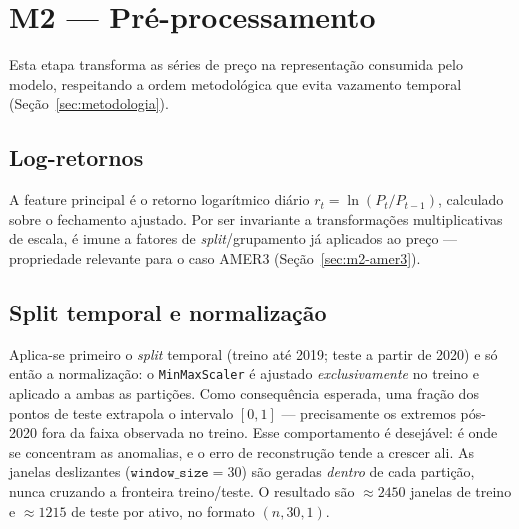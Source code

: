 \section{M2 --- Pré-processamento}
\label{sec:m2}

Esta etapa transforma as séries de preço na representação consumida pelo modelo,
respeitando a ordem metodológica que evita vazamento temporal (Seção~\ref{sec:metodologia}).

\subsection{Log-retornos}
A feature principal é o retorno logarítmico diário $r_t = \ln(P_t/P_{t-1})$, calculado
sobre o fechamento ajustado. Por ser invariante a transformações multiplicativas de
escala, é imune a fatores de \emph{split}/grupamento já aplicados ao preço --- propriedade
relevante para o caso AMER3 (Seção~\ref{sec:m2-amer3}).

\subsection{Split temporal e normalização}
Aplica-se primeiro o \emph{split} temporal (treino até 2019; teste a partir de 2020) e só
então a normalização: o \texttt{MinMaxScaler} é ajustado \emph{exclusivamente} no treino e
aplicado a ambas as partições. Como consequência esperada, uma fração dos pontos de teste
extrapola o intervalo $[0,1]$ --- precisamente os extremos pós-2020 fora da faixa observada
no treino. Esse comportamento é desejável: é onde se concentram as anomalias, e o erro de
reconstrução tende a crescer ali. As janelas deslizantes ($\texttt{window\_size}=30$) são
geradas \emph{dentro} de cada partição, nunca cruzando a fronteira treino/teste. O
resultado são $\approx 2450$ janelas de treino e $\approx 1215$ de teste por ativo, no
formato $(n, 30, 1)$.


